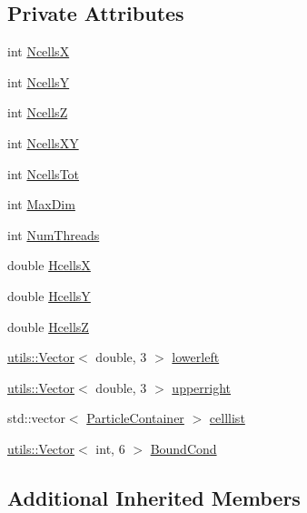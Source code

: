 \subsection*{Private Attributes}
\begin{DoxyCompactItemize}
\item 
int \hyperlink{classLinkedCellsContainer_a7e6ba97fe863d6dbcac93055f0945afc}{NcellsX}
\item 
int \hyperlink{classLinkedCellsContainer_a5d2caeb5e18c7691a7069d6d21ffb8f2}{NcellsY}
\item 
int \hyperlink{classLinkedCellsContainer_a422564396900533ee91d18fb9ead2c97}{NcellsZ}
\item 
int \hyperlink{classLinkedCellsContainer_a1e3adae4412e9e0e868dec802002d5ca}{Ncells\+XY}
\item 
int \hyperlink{classLinkedCellsContainer_a36307e254b1de62d27bbea099c244987}{Ncells\+Tot}
\item 
int \hyperlink{classLinkedCellsContainer_aa4b41b08627320b31ea4af06367901d1}{Max\+Dim}
\item 
int \hyperlink{classLinkedCellsContainer_ac8ae53015a3e5ed5bf413677dc3b506c}{Num\+Threads}
\item 
double \hyperlink{classLinkedCellsContainer_a6bf86e59ebe06054d1d118db261c2069}{HcellsX}
\item 
double \hyperlink{classLinkedCellsContainer_aa3c791c560dc1f5d3a5c8b48e0f93766}{HcellsY}
\item 
double \hyperlink{classLinkedCellsContainer_a5cd84e8209277710280e71becbaf7f65}{HcellsZ}
\item 
\hyperlink{classutils_1_1Vector}{utils\+::\+Vector}$<$ double, 3 $>$ \hyperlink{classLinkedCellsContainer_a9fed9ed73581f98ddc3cd3769b306937}{lowerleft}
\item 
\hyperlink{classutils_1_1Vector}{utils\+::\+Vector}$<$ double, 3 $>$ \hyperlink{classLinkedCellsContainer_a81d492dc2e1948839a6a45b0b1fe463f}{upperright}
\item 
std\+::vector$<$ \hyperlink{classParticleContainer}{Particle\+Container} $>$ \hyperlink{classLinkedCellsContainer_a71ab828ce5a0300256ce9d263dd03b71}{celllist}
\item 
\hyperlink{classutils_1_1Vector}{utils\+::\+Vector}$<$ int, 6 $>$ \hyperlink{classLinkedCellsContainer_a0f3e5cc44b3f152a4199c54e43b40d57}{Bound\+Cond}
\end{DoxyCompactItemize}
\subsection*{Additional Inherited Members}


